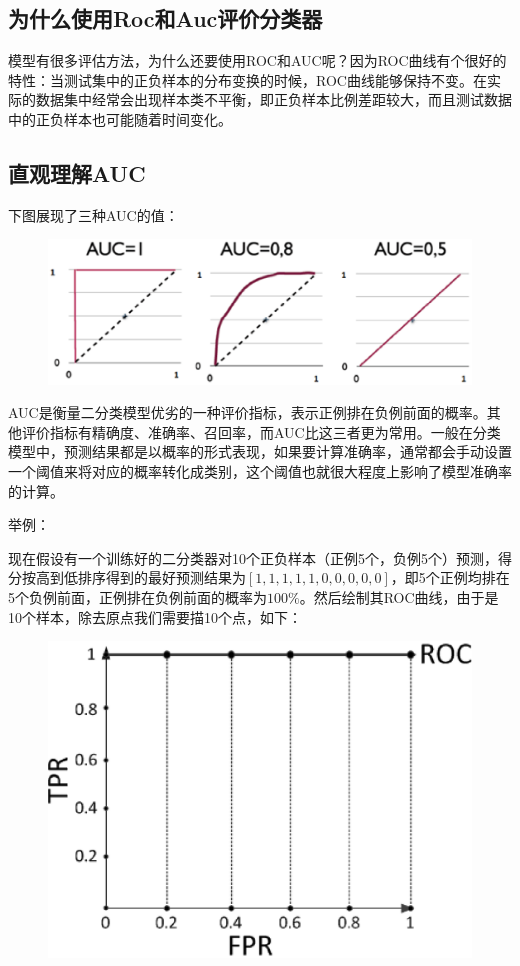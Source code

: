 \subsection{为什么使用Roc和Auc评价分类器}

模型有很多评估方法，为什么还要使用ROC和AUC呢？因为ROC曲线有个很好的特性：当测试集中的正负样本的分布变换的时候，ROC曲线能够保持不变。在实际的数据集中经常会出现样本类不平衡，即正负样本比例差距较大，而且测试数据中的正负样本也可能随着时间变化。

\subsection{直观理解AUC}

下图展现了三种AUC的值： 

 \begin{figure}[h]
   \centering
   \includegraphics[width=.7\textwidth]{imgs/2.40.15.1.eps}
 \end{figure}

AUC是衡量二分类模型优劣的一种评价指标，表示正例排在负例前面的概率。其他评价指标有精确度、准确率、召回率，而AUC比这三者更为常用。一般在分类模型中，预测结果都是以概率的形式表现，如果要计算准确率，通常都会手动设置一个阈值来将对应的概率转化成类别，这个阈值也就很大程度上影响了模型准确率的计算。

举例：

现在假设有一个训练好的二分类器对10个正负样本（正例5个，负例5个）预测，得分按高到低排序得到的最好预测结果为$[1, 1, 1, 1, 1, 0, 0, 0, 0, 0]$，即5个正例均排在5个负例前面，正例排在负例前面的概率为$100\%$。然后绘制其ROC曲线，由于是10个样本，除去原点我们需要描10个点，如下：

 \begin{figure}[h]
   \centering
   \includegraphics[width=.7\textwidth]{imgs/2.16.17-1.eps}
 \end{figure}

